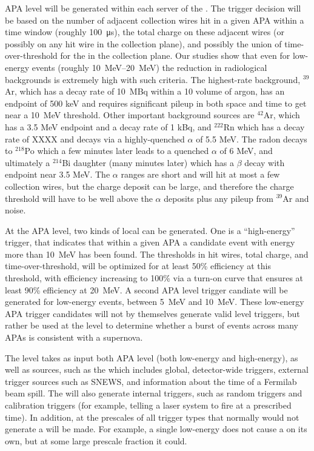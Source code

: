 APA level  will be generated within each server
of the . 
The trigger decision will be based on the number of adjacent
collection wires hit in a given APA within a time window (roughly
\SI{100}{\us}), the total charge on these adjacent wires (or possibly
on any hit wire in the collection plane), and possibly the union of
time-over-threshold for the  in the collection
plane.
Our studies show that even for low-energy events (roughly
\SIrange{10}{20}{\MeV}) the reduction in radiological backgrounds is
extremely high with such criteria.
The highest-rate background, $^{39}$Ar, which has a decay rate of
10~MBq within a \SI{10}{\kton} volume of argon, has an endpoint of 500
keV and requires significant pileup in both space and time to get near
a \SI{10}{\MeV} threshold.
Other important background sources are $^{42}$Ar, which has a 3.5 MeV
endpoint and a decay rate of 1 kBq, and $^{222}$Rn which has a decay
rate of XXXX and decays via a highly-quenched $\alpha$ of 5.5 MeV.
The radon decays to $^{218}$Po which a few minutes later leads to a
quenched $\alpha$ of 6 MeV, and ultimately a $^{214}$Bi daughter (many
minutes later) which has a $\beta$ decay with endpoint near 3.5 MeV. 
The $\alpha$ ranges are short and will hit at most a few collection
wires, but the charge deposit can be large, and therefore the charge
threshold will have to be well above the $\alpha$ deposits plus any
pileup from $^{39}$Ar and noise.

At the APA level, two kinds of local  can be
generated.
One is a ``high-energy'' trigger, that indicates that within a given
APA a candidate event with energy more than \SI{10}{\MeV} has been
found.
The thresholds in hit wires, total charge, and time-over-threshold,
will be optimized for at least 50\% efficiency at this threshold, with
efficiency increasing to 100\% via a turn-on curve that ensures at
least 90\% efficiency at \SI{20}{\MeV}. 
A second APA level trigger candiate will be generated for low-energy
events, between \SI{5}{\MeV} and \SI{10}{\MeV}. 
These low-energy APA trigger candidates will not by themselves
generate valid  level triggers, but rather be used at
the  level to determine whether a burst of events
across many APAs is consistent with a supernova.

The  level takes as input both APA level
 (both low-energy and high-energy), as well as
 sources, such as the  which includes
global, detector-wide triggers, external trigger sources such as
SNEWS, and information about the time of a Fermilab beam spill. 
The  will also generate internal triggers, such as random
triggers and calibration triggers (for example, telling a laser system
to fire at a prescribed time). 
In addition, at the  prescales of all trigger types that
normally would not generate a  will be made. 
For example, a single low-energy  does not cause
a  on its own, but at some large prescale fraction
it could.


